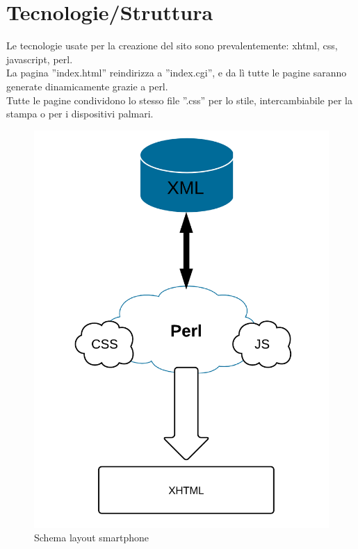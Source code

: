 \section{Tecnologie/Struttura }
Le tecnologie usate per la creazione del sito sono prevalentemente: xhtml, css, javascript, perl. \\
La pagina ''index.html'' reindirizza a ''index.cgi'', e da lì tutte le pagine saranno generate dinamicamente grazie a perl.\\
Tutte le pagine condividono lo stesso file ''.css'' per lo stile, intercambiabile per la stampa o per i dispositivi palmari.

\begin{center}
\begin{figure}[H]
\centering
\includegraphics[scale=0.55]{images/struttura.png}
\caption{Schema layout smartphone}
\end{figure}
\end{center}

